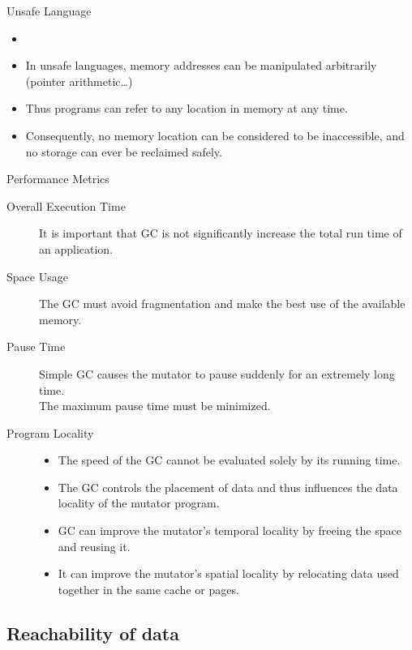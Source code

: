 \begin{bibunit}[apalike]
\begin{frame}{Unsafe Language}
	\begin{itemize}
	\item {}
	\vfill
	\item In unsafe languages, memory addresses can be manipulated arbitrarily (pointer arithmetic\dots)
	\vfill
	\item Thus programs can refer to any location in memory at any time.
	\vfill
	\item Consequently, no memory location can be considered to be inaccessible, and no storage can ever be reclaimed safely.
	\end{itemize}
\end{frame}

\begin{frame}{Performance Metrics}
	\begin{footnotesize}
	\begin{description}
	\item[Overall Execution Time] It is important that GC is not significantly increase the total run time of an application.
	\vfill
	\item[Space Usage] The GC must avoid fragmentation and make the best use of the available memory.
	\vfill
	\item[Pause Time] Simple GC causes the mutator to pause suddenly for an extremely long time. \\
		The maximum pause time must be minimized.
	\vfill
	\item[Program Locality] \begin{itemize}
		\item The speed of the GC cannot be evaluated solely by its running time.
		\item The GC controls the placement of data and thus influences the data locality of the mutator program.
		\item GC can improve the mutator's temporal locality by freeing the space and reusing it.
		\item It can improve the mutator's spatial locality by relocating data used together in the same cache or pages.
		\end{itemize}
	\end{description}
	\end{footnotesize}
\end{frame}

\subsection{Reachability of data}


\end{bibunit}
